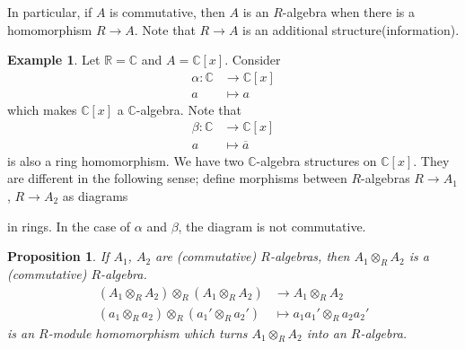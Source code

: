 \documentclass[12pt]{report}
\theoremstyle{plain}
\newtheorem{proposition}[theorem]{Proposition}
\theoremstyle{remark}
\theoremstyle{definition}
\newtheorem{example}[theorem]{Example}
\newcommand{\R}{\mathbb{R}}
\newcommand{\C}{\mathbb{C}}
\begin{document}
In particular, if $A$ is commutative, then $A$ is an $R$-algebra when there is a homomorphism $R\to A$. Note that $R\to A$ is an additional structure(information).

\begin{example}
    Let $\R=\C$ and $A=\C[x]$. Consider
    \begin{align*}
        \alpha:\C&\to \C[x] \\
        a &\mapsto a
    \end{align*}
    which makes $\C[x]$ a $\C$-algebra. Note that
    \begin{align*}
        \beta:\C&\to \C[x] \\
        a &\mapsto \overline{a}
    \end{align*}
    is also a ring homomorphism. We have two $\C$-algebra structures on $\C[x]$. They are different in the following sense; define morphisms between $R$-algebras $R\to A_1$, $R\to A_2$ as diagrams
    \begin{figure}[H]
        \centering
    \end{figure}
    \noindent in rings. In the case of $\alpha$ and $\beta$, the diagram is not commutative.
\end{example}

\begin{proposition}
    If $A_1$, $A_2$ are (commutative) $R$-algebras, then $A_1\otimes_R A_2$ is a (commutative) $R$-algebra.
    \begin{align*}
        (A_1\otimes_R A_2) \otimes_R (A_1\otimes_R A_2) &\to A_1\otimes_R A_2 \\
        (a_1\otimes_R a_2) \otimes_R (a_1'\otimes_R a_2') &\mapsto a_1a_1'\otimes_R a_2 a_2'
    \end{align*}
    is an $R$-module homomorphism which turns $A_1\otimes_R A_2$ into an $R$-algebra.
\end{proposition}
\end{document}
